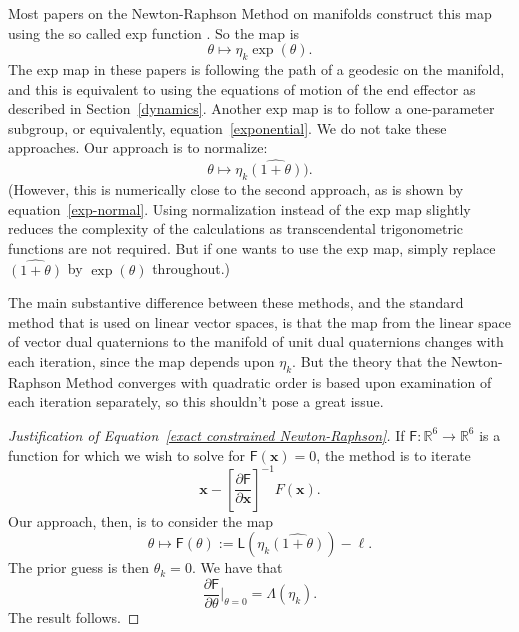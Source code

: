 \documentclass[reqno,12pt]{amsart}
\begin{document}
Most papers on the Newton-Raphson Method on manifolds construct this map using the so called exp function \cite{dedieu-et-al,fernandes-et-al,ferreira-svaiter}.  So the map is
\begin{equation}
\theta \mapsto \eta_k \exp(\theta).
\end{equation}
The exp map in these papers is following the path of a geodesic on the manifold, and this is equivalent to using the equations of motion of the end effector as described in Section~\ref{dynamics}.  Another exp map is to follow a one-parameter subgroup, or equivalently, equation~\eqref{exponential}.  We do not take these approaches.  Our approach is to normalize:
\begin{equation}
\theta \mapsto \eta_k  \widehat{(1 + \theta)}).
\end{equation}
(However, this is numerically close to the second approach, as is shown by equation~\eqref{exp-normal}.  Using normalization instead of the exp map slightly reduces the complexity of the calculations as transcendental trigonometric functions are not required.  But if one wants to use the exp map, simply replace $\widehat{(1+\theta)}$ by $\exp(\theta)$ throughout.)

The main substantive difference between these methods, and the standard method that is used on linear vector spaces,  is that the map from the linear space of vector dual quaternions to the manifold of unit dual quaternions changes with each iteration, since the map depends upon $\eta_k$.  But the theory that the Newton-Raphson Method converges with quadratic order is based upon examination of each iteration separately, so this shouldn't pose a great issue.

\begin{proof}[Justification of Equation~\eqref{exact constrained Newton-Raphson}]
If $\mathsf F:\mathbb R^6 \to \mathbb R^6$ is a function for which we wish to solve for $\mathsf F(\bm x) = 0$, the method is to iterate
\begin{equation}
\bm x - \left[\frac{\partial \mathsf F}{\partial \bm x}\right]^{-1} F(\bm x) .
\end{equation}
Our approach, then, is to consider the map
\begin{equation}
\theta \mapsto \mathsf F(\theta) := \mathsf L(\eta_k \widehat{(1 + \theta)}) - \bm\ell.
\end{equation}
The prior guess is then $\theta_k = 0$.  We have that
\begin{equation}
\frac{\partial \mathsf F}{\partial \theta} \Big|_{\theta = 0} = \mathsf \Lambda(\eta_k) .
\end{equation}
The result follows.
\end{proof}
\end{document}
